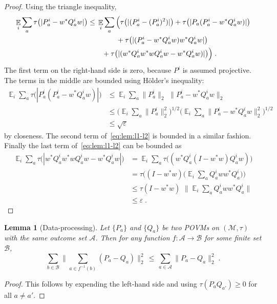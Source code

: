 \documentclass[11pt]{article}
\newtheorem{lemma}[theorem]{Lemma}
\theoremstyle{definition}
\DeclareMathOperator*{\Expectation}{\mathbb{E}}
\newcommand{\Es}[1]{\Expectation_{#1}}
\newcommand{\mA}{\ensuremath{\mathcal{A}}}
\newcommand{\mB}{\ensuremath{\mathcal{B}}}
\newcommand{\mM}{\ensuremath{\mathcal{M}}}
\newcommand{\eps}{\varepsilon}
\begin{document}
\begin{proof}
Using the triangle inequality, 
\begin{align}
\Es{i} \sum_a \tau\big(|P^i_a - w^* Q^i_a w|\big) &\leq\, \Es{i}\sum_a \Big(\tau\big(|(P^i_a-(P^i_a)^2)|\big) + \tau\big(|P_a(P^i_a-w^*Q^i_aw)|\big) \notag\\
&\qquad\qquad+ \tau\big(|(P^i_a-w^*Q^i_aw)w^*Q^i_aw|\big) \notag \\
 \label{eq:lem:l1-l2}
&\qquad +\tau\big(| (w^*Q^i_aw^*wQ^i_aw-w^*Q^i_aw)|\big)\Big)\;.
\end{align}
The first term on the right-hand side is zero, because $P^i$ is assumed projective. The terms in the middle are bounded using H\"older's inequality:
\begin{align*}
\Es{i}\sum_a  \tau\big(|P^i_a(P^i_a-w^*Q^i_aw)|\big) &\leq \Es{i} \sum_a \|P^i_a\|_2 \, \, \|P^i_a-w^*Q^i_aw\|_2\\
&\leq \Big(\Es{i}\sum_a \|P^i_a\|^2_2\Big)^{1/2}\Big( \Es{i}\sum_a  \|P^i_a-w^*Q^i_aw\|_2^2 \Big)^{1/2}\\
&\leq \sqrt{\eps}
\end{align*}
by closeness. The second term of~\eqref{eq:lem:l1-l2} is bounded in a similar fashion.
Finally the last term of~\eqref{eq:lem:l1-l2} can be bounded as 
\begin{align*}
\Es{i}\sum_a \tau\big(| w^*Q^i_aw^*wQ^i_aw-w^*Q^i_aw|\big) &= \Es{i}\sum_a \tau\big( (w^*Q^i_a(I - w^*w)Q^i_aw)\big)\\
&=  \tau\Big( (I-w^*w)\Big(\Es{i}\sum_a Q^i_aww^* Q^i_a\Big)\Big)\\
&\leq \tau(I-w^*w) \,\, \Big\|\Es{i}\sum_a Q^i_aww^* Q^i_a\Big\|\\
&\leq \eps\;.
\end{align*}
\end{proof}

\begin{lemma}[Data-processing]\label{lem:dp}
Let $\{P_a\}$ and $\{Q_a\}$ be two POVMs on $(\mM,\tau)$ with the same outcome set $\mA$. Then for any function $f:\mA\to \mB$ for some finite set $\mB$, 
\begin{equation}\label{eq:dp}
\sum_{b\in \mB} \Big\| \sum_{a\in f^{-1}(b)} (P_a-Q_a) \Big\|_2^2 \,\leq\, \sum_{a\in \mA} \big\| P_a-Q_a\big\|_2^2\;.
\end{equation}
\end{lemma}

\begin{proof}
This follows by expending the left-hand side and using $\tau(P_aQ_{a'})\geq 0$ for all $a\neq a'$. 
\end{proof}
	
\end{document}
